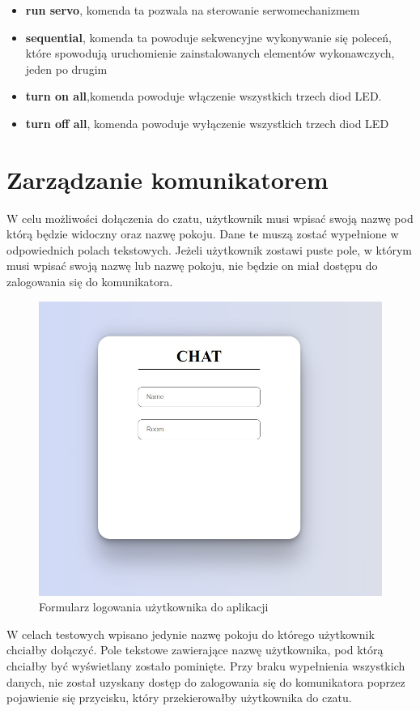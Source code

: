 \begin{itemize}
	\\
	\item \textbf{run servo}, komenda ta pozwala na sterowanie serwomechanizmem
	\\
\item \textbf{sequential}, komenda ta powoduje sekwencyjne wykonywanie się poleceń, które spowodują uruchomienie zainstalowanych elementów wykonawczych, jeden po drugim
	\\
	\item \textbf{turn on all},komenda powoduje włączenie wszystkich trzech diod LED.
	\\
\item \textbf{turn off all}, komenda powoduje wyłączenie wszystkich trzech diod LED
	\\
\end{itemize}
\newpage
\section{Zarządzanie komunikatorem}
W celu możliwości dołączenia do czatu, użytkownik musi wpisać swoją nazwę pod którą będzie widoczny oraz nazwę pokoju. Dane te muszą zostać wypełnione w odpowiednich polach tekstowych. Jeżeli użytkownik zostawi puste pole, w którym musi wpisać swoją nazwę lub nazwę pokoju, nie będzie on miał dostępu do zalogowania się do komunikatora.
\begin{figure}[htbp]
	\centering
	\includegraphics[width=0.5\linewidth]{"obrazy/TESTLOGOWANIE"}
	\caption{Formularz logowania użytkownika do aplikacji}
	\label{fig:39}
\end{figure}
\newpage
W celach testowych wpisano jedynie nazwę pokoju do którego użytkownik chciałby dołączyć. Pole tekstowe zawierające nazwę użytkownika, pod którą chciałby być wyświetlany zostało pominięte. Przy braku wypełnienia wszystkich danych, nie został uzyskany dostęp do zalogowania się do komunikatora poprzez pojawienie się przycisku, który przekierowałby użytkownika do czatu.

